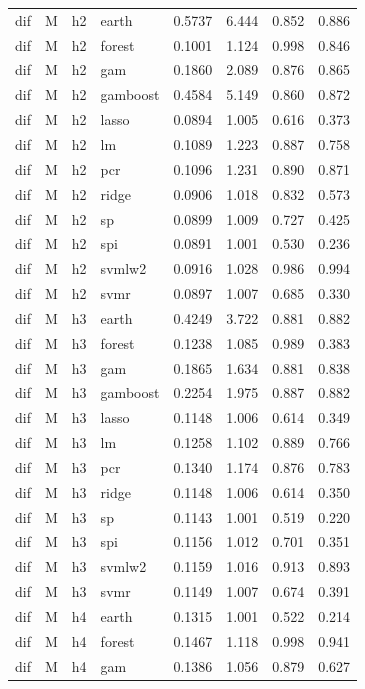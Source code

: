 \begin{ThreePartTable}
\begin{longtable}[t]{llclcccc}
dif & M & h2 & earth & 0.5737 & 6.444 & 0.852 & 0.886\\
dif & M & h2 & forest & 0.1001 & 1.124 & 0.998 & 0.846\\
dif & M & h2 & gam & 0.1860 & 2.089 & 0.876 & 0.865\\
dif & M & h2 & gamboost & 0.4584 & 5.149 & 0.860 & 0.872\\
dif & M & h2 & lasso & 0.0894 & 1.005 & 0.616 & 0.373\\
dif & M & h2 & lm & 0.1089 & 1.223 & 0.887 & 0.758\\
dif & M & h2 & pcr & 0.1096 & 1.231 & 0.890 & 0.871\\
dif & M & h2 & ridge & 0.0906 & 1.018 & 0.832 & 0.573\\
dif & M & h2 & sp & 0.0899 & 1.009 & 0.727 & 0.425\\
dif & M & h2 & spi & 0.0891 & 1.001 & 0.530 & 0.236\\
dif & M & h2 & svmlw2 & 0.0916 & 1.028 & 0.986 & 0.994\\
dif & M & h2 & svmr & 0.0897 & 1.007 & 0.685 & 0.330\\
\addlinespace
dif & M & h3 & earth & 0.4249 & 3.722 & 0.881 & 0.882\\
dif & M & h3 & forest & 0.1238 & 1.085 & 0.989 & 0.383\\
dif & M & h3 & gam & 0.1865 & 1.634 & 0.881 & 0.838\\
dif & M & h3 & gamboost & 0.2254 & 1.975 & 0.887 & 0.882\\
dif & M & h3 & lasso & 0.1148 & 1.006 & 0.614 & 0.349\\
dif & M & h3 & lm & 0.1258 & 1.102 & 0.889 & 0.766\\
dif & M & h3 & pcr & 0.1340 & 1.174 & 0.876 & 0.783\\
dif & M & h3 & ridge & 0.1148 & 1.006 & 0.614 & 0.350\\
dif & M & h3 & sp & 0.1143 & 1.001 & 0.519 & 0.220\\
dif & M & h3 & spi & 0.1156 & 1.012 & 0.701 & 0.351\\
dif & M & h3 & svmlw2 & 0.1159 & 1.016 & 0.913 & 0.893\\
dif & M & h3 & svmr & 0.1149 & 1.007 & 0.674 & 0.391\\
\addlinespace
dif & M & h4 & earth & 0.1315 & 1.001 & 0.522 & 0.214\\
dif & M & h4 & forest & 0.1467 & 1.118 & 0.998 & 0.941\\
dif & M & h4 & gam & 0.1386 & 1.056 & 0.879 & 0.627\\

\end{longtable}
\end{ThreePartTable}
